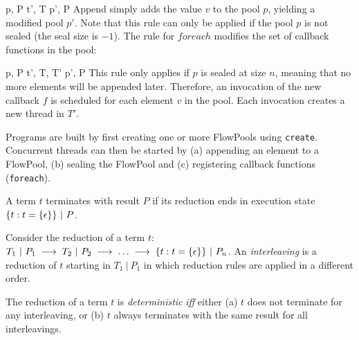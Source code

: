 {  {p, P} {t', T} {p', P}
}
\noindent
Append simply adds the value $v$ to the pool $p$, yielding a modified
pool $p'$. Note that this rule can only be applied if the pool $p$ is
not sealed (the seal size is $-1$). The rule for $foreach$ modifies
the set of callback functions in the pool:

{  {p, P} {t', T, T'} {p', P}
}
\noindent
This rule only applies if $p$ is sealed at size $n$, meaning that
no more elements will be appended later. Therefore, an
invocation of the new callback $f$ is scheduled for each
element $v$ in the pool. Each invocation creates a new thread in $T'$.

Programs are built by first creating one or more FlowPools using
\texttt{create}. Concurrent threads can then be started by (a)
appending an element to a FlowPool, (b) sealing the FlowPool
and (c) registering callback functions (\texttt{foreach}).

\begin{definition}[Termination]
A term $t$ terminates with result $P$ if its reduction ends in
execution state $\{t : t = \{\epsilon\}\}~|~P$.
\end{definition}

\begin{definition}[Interleaving]
  Consider the reduction of a term $t$: $T_1~|~P_1 \;\longrightarrow\;
  T_2~|~P_2 \;\longrightarrow\; \ldots \;\longrightarrow\;
  \{t : t = \{\epsilon\}\}~|~P_n$. An \emph{interleaving} is a reduction of $t$
  starting in $T_1~|~P_1$ in which reduction rules are
  applied in a different order.
\end{definition}


\begin{definition}[Determinism]
The reduction of a term $t$ is \emph{deterministic} \emph{iff} either
(a) $t$ does not terminate for any interleaving, or (b) $t$ always
terminates with the same result for all interleavings.
\end{definition}

